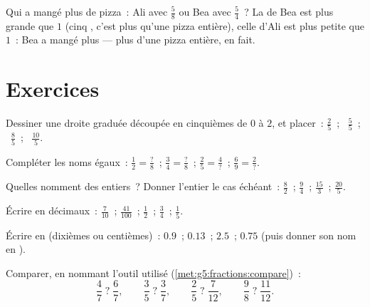 \begin{example}\label{ex:g5:fractions:compare}
Qui a mangé plus de pizza~: Ali avec $\frac58$ ou Bea avec
$\frac54$~? La  de Bea est plus grande que $1$ (cinq
, c'est plus qu'une pizza entière), celle d'Ali est plus
petite que $1$~: Bea a mangé plus --- plus d'une pizza entière, en
fait.
\end{example}

\section{Exercices}

\begin{exercise}[$\star$]\label{exo:g5:fractions:1}
Dessiner une droite graduée découpée en cinquièmes de $0$ à $2$, et
placer~: $\frac25$~; \ $\frac55$~; \ $\frac85$~; \ $\frac{10}{5}$.
\end{exercise}

\begin{exercise}[$\star$]\label{exo:g5:fractions:2}
Compléter les noms égaux~:
$\frac12 = \frac{?}{8}$~; \quad
$\frac34 = \frac{?}{8}$~; \quad
$\frac{2}{5} = \frac{4}{?}$~; \quad
$\frac{6}{9} = \frac{2}{?}$.
\end{exercise}

\begin{exercise}[$\star$]\label{exo:g5:fractions:3}
Quelles  nomment des entiers~? Donner l'entier le cas
échéant~: $\frac82$~; \quad $\frac{9}{4}$~; \quad $\frac{15}{3}$~;
\quad $\frac{20}{5}$.
\end{exercise}

\begin{exercise}[$\star$]\label{exo:g5:fractions:4}
Écrire en décimaux~: $\frac{7}{10}$~; \quad $\frac{41}{100}$~; \quad
$\frac12$~; \quad $\frac34$~; \quad $\frac15$.
\end{exercise}

\begin{exercise}[$\star$]\label{exo:g5:fractions:5}
Écrire en  (dixièmes ou centièmes)~: $0.9$~; \quad
$0.13$~; \quad $2.5$~; \quad $0.75$ (puis donner son nom en
).
\end{exercise}

\begin{exercise}[$\star$]\label{exo:g5:fractions:6}
Comparer, en nommant l'outil utilisé
(\cref{met:g5:fractions:compare})~:
\[
\frac47 \;?\; \frac67, \qquad
\frac35 \;?\; \frac37, \qquad
\frac25 \;?\; \frac{7}{12}, \qquad
\frac98 \;?\; \frac{11}{12} .
\]
\end{exercise}

